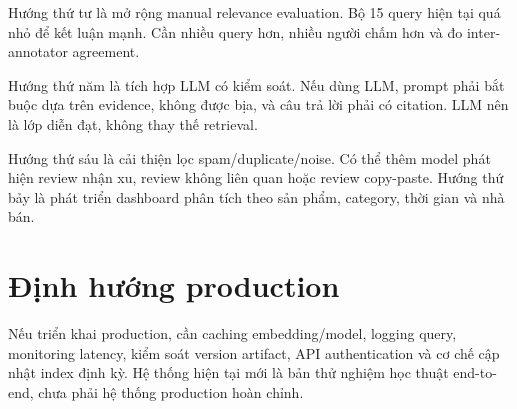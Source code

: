 Hướng thứ tư là mở rộng manual relevance evaluation. Bộ 15 query hiện tại quá nhỏ để kết luận mạnh. Cần nhiều query hơn, nhiều người chấm hơn và đo inter-annotator agreement.

Hướng thứ năm là tích hợp LLM có kiểm soát. Nếu dùng LLM, prompt phải bắt buộc dựa trên evidence, không được bịa, và câu trả lời phải có citation. LLM nên là lớp diễn đạt, không thay thế retrieval.

Hướng thứ sáu là cải thiện lọc spam/duplicate/noise. Có thể thêm model phát hiện review nhận xu, review không liên quan hoặc review copy-paste. Hướng thứ bảy là phát triển dashboard phân tích theo sản phẩm, category, thời gian và nhà bán.

\section{Định hướng production}
Nếu triển khai production, cần caching embedding/model, logging query, monitoring latency, kiểm soát version artifact, API authentication và cơ chế cập nhật index định kỳ. Hệ thống hiện tại mới là bản thử nghiệm học thuật end-to-end, chưa phải hệ thống production hoàn chỉnh.

